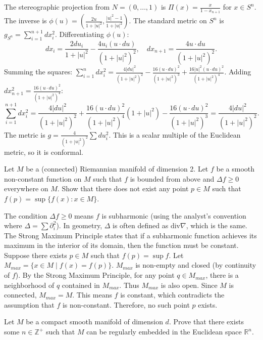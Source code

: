 \begin{solution}
The stereographic projection from $N=(0, \dots, 1)$ is $\Pi(x) = \frac{x}{1-x_{n+1}}$ for $x \in S^n$.
The inverse is $\phi(u) = \left( \frac{2u}{1+|u|^2}, \frac{|u|^2-1}{1+|u|^2} \right)$.
The standard metric on $S^n$ is $g_{S^n} = \sum_{i=1}^{n+1} dx_i^2$.
Differentiating $\phi(u)$:
\[ dx_i = \frac{2 du_i}{1+|u|^2} - \frac{4 u_i (u \cdot du)}{(1+|u|^2)^2}, \quad dx_{n+1} = \frac{4 u \cdot du}{(1+|u|^2)^2}. \]
Summing the squares:
$\sum_{i=1}^n dx_i^2 = \frac{4 |du|^2}{(1+|u|^2)^2} - \frac{16 (u \cdot du)^2}{(1+|u|^2)^3} + \frac{16 |u|^2 (u \cdot du)^2}{(1+|u|^2)^4}$.
Adding $dx_{n+1}^2 = \frac{16 (u \cdot du)^2}{(1+|u|^2)^4}$:
\[ \sum_{i=1}^{n+1} dx_i^2 = \frac{4 |du|^2}{(1+|u|^2)^2} + \frac{16 (u \cdot du)^2}{(1+|u|^2)^4} (1 + |u|^2) - \frac{16 (u \cdot du)^2}{(1+|u|^2)^3} = \frac{4 |du|^2}{(1+|u|^2)^2}. \]
The metric is $g = \frac{4}{(1+|u|^2)^2} \sum du_i^2$. This is a scalar multiple of the Euclidean metric, so it is conformal.
\end{solution}

\begin{exercise}
\label{geometry:2010:8}
Let $M$ be a (connected) Riemannian manifold of dimension 2. Let $f$ be a smooth non-constant function on $M$ such that $f$ is bounded from above and $\Delta f \geq 0$ everywhere on $M$. Show that there does not exist any point $p \in M$ such that $f(p) = \sup \{f(x) : x \in M\}$.
\end{exercise}

\begin{solution}
The condition $\Delta f \geq 0$ means $f$ is subharmonic (using the analyst's convention where $\Delta = \sum \partial_i^2$). In geometry, $\Delta$ is often defined as $\text{div} \nabla$, which is the same.
The Strong Maximum Principle states that if a subharmonic function achieves its maximum in the interior of its domain, then the function must be constant.
Suppose there exists $p \in M$ such that $f(p) = \sup f$. Let $M_{max} = \{ x \in M \mid f(x) = f(p) \}$.
$M_{max}$ is non-empty and closed (by continuity of $f$).
By the Strong Maximum Principle, for any point $q \in M_{max}$, there is a neighborhood of $q$ contained in $M_{max}$. Thus $M_{max}$ is also open.
Since $M$ is connected, $M_{max} = M$. This means $f$ is constant, which contradicts the assumption that $f$ is non-constant.
Therefore, no such point $p$ exists.
\end{solution}

\begin{exercise}
\label{geometry:2010:9}
Let $M$ be a compact smooth manifold of dimension $d$. Prove that there exists some $n \in \mathbb{Z}^{+}$ such that $M$ can be regularly embedded in the Euclidean space $\mathbb{R}^{n}$.
\end{exercise}

